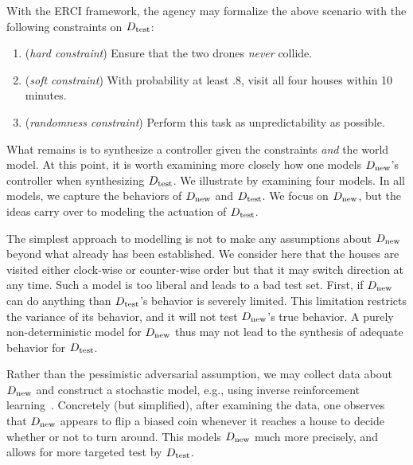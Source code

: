 With the ERCI framework, the agency may formalize the above scenario with the
following constraints on ${D_{\text{test}}}$:
\begin{enumerate}
\item (\emph{hard constraint}) Ensure that the two drones \emph{never} collide.
\item (\emph{soft constraint}) With probability at least $.8$, visit all four houses within 10 minutes.
\item (\emph{randomness constraint}) Perform this task as unpredictability as possible.
\end{enumerate}
What  remains is to synthesize a controller given the constraints
\emph{and} the world model. At this point, it is worth examining more
closely how one models ${D_{\text{new}}}$'s controller when synthesizing
${D_{\text{test}}}$. We illustrate by examining four models. In all models, we capture the behaviors of ${D_{\text{new}}}$ and ${D_{\text{test}}}$. We focus on ${D_{\text{new}}}$, but the ideas carry over to modeling the actuation of ${D_{\text{test}}}$.
%

The simplest approach to modelling is not to make any assumptions about  ${D_{\text{new}}}$ beyond what already has been established. We consider here that the houses are visited either clock-wise or counter-wise order but that it may switch direction at any time. 
Such a model is too liberal and leads to a bad test set.
First, if ${D_{\text{new}}}$ can do anything than ${D_{\text{test}}}$'s behavior is severely limited. This limitation restricts the variance of its behavior, and it will not test ${D_{\text{new}}}$'s true behavior. 
A purely non-deterministic model for ${D_{\text{new}}}$ thus may not lead to the synthesis of adequate behavior for ${D_{\text{test}}}$. 

Rather than the pessimistic adversarial assumption, we may collect data about ${D_{\text{new}}}$ and construct a stochastic model, e.g., using inverse reinforcement learning~\cite{}.
Concretely (but simplified), after examining the data, one observes that ${D_{\text{new}}}$ appears
to flip a biased coin whenever it reaches a house to decide whether or
not to turn around. 
This models ${D_{\text{new}}}$ much more precisely, and allows for more targeted test by ${D_{\text{test}}}$.

